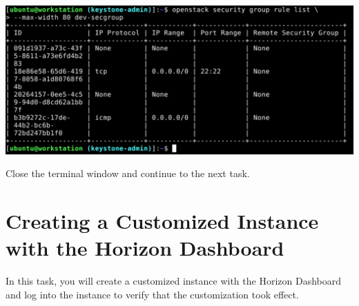 \documentclass[letterpaper, 12pt]{article}
\begin{document}
\begin{enumerate}
\begin{labstep}
        \begin{center}
            \includegraphics[width=\linewidth]{images/part1/step29.png}
        \end{center}
    \end{labstep}

    \begin{labstep}
        Close the terminal window and continue to the next task.
    \end{labstep}
\end{enumerate}

\section{Creating a Customized Instance with the Horizon Dashboard}\label{sec:creating_a_customized_instance_using_the_horizon_dashboard}
In this task, you will create a customized instance with the Horizon Dashboard and log into the instance to verify that the customization took effect.
\end{document}
